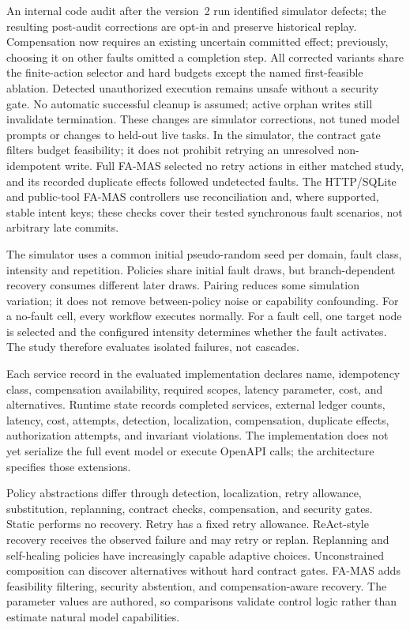 \documentclass[10pt,journal,compsoc]{IEEEtran}
\newcommand{\famas}{FA-MAS}
\begin{document}
An internal code audit after the version~2 run identified simulator defects; the resulting post-audit corrections are opt-in and preserve historical replay. Compensation now requires an existing uncertain committed effect; previously, choosing it on other faults omitted a completion step. All corrected variants share the finite-action selector and hard budgets except the named first-feasible ablation. Detected unauthorized execution remains unsafe without a security gate. No automatic successful cleanup is assumed; active orphan writes still invalidate termination. These changes are simulator corrections, not tuned model prompts or changes to held-out live tasks. In the simulator, the contract gate filters budget feasibility; it does not prohibit retrying an unresolved non-idempotent write. Full FA-MAS selected no retry actions in either matched study, and its recorded duplicate effects followed undetected faults. The HTTP/SQLite and public-tool FA-MAS controllers use reconciliation and, where supported, stable intent keys; these checks cover their tested synchronous fault scenarios, not arbitrary late commits.

The simulator uses a common initial pseudo-random seed per domain, fault class, intensity and repetition. Policies share initial fault draws, but branch-dependent recovery consumes different later draws. Pairing reduces some simulation variation; it does not remove between-policy noise or capability confounding. For a no-fault cell, every workflow executes normally. For a fault cell, one target node is selected and the configured intensity determines whether the fault activates. The study therefore evaluates isolated failures, not cascades.

Each service record in the evaluated implementation declares name, idempotency class, compensation availability, required scopes, latency parameter, cost, and alternatives. Runtime state records completed services, external ledger counts, latency, cost, attempts, detection, localization, compensation, duplicate effects, authorization attempts, and invariant violations. The implementation does not yet serialize the full event model or execute OpenAPI calls; the architecture specifies those extensions.

Policy abstractions differ through detection, localization, retry allowance, substitution, replanning, contract checks, compensation, and security gates. Static performs no recovery. Retry has a fixed retry allowance. ReAct-style recovery receives the observed failure and may retry or replan. Replanning and self-healing policies have increasingly capable adaptive choices. Unconstrained composition can discover alternatives without hard contract gates. \famas{} adds feasibility filtering, security abstention, and compensation-aware recovery. The parameter values are authored, so comparisons validate control logic rather than estimate natural model capabilities.
\end{document}
